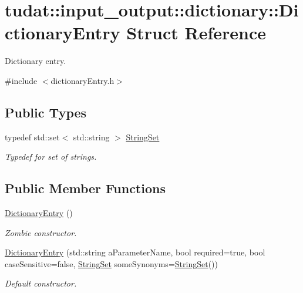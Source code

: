 \hypertarget{structtudat_1_1input__output_1_1dictionary_1_1DictionaryEntry}{}\section{tudat\+:\+:input\+\_\+output\+:\+:dictionary\+:\+:Dictionary\+Entry Struct Reference}
\label{structtudat_1_1input__output_1_1dictionary_1_1DictionaryEntry}


Dictionary entry.  




{\ttfamily \#include $<$dictionary\+Entry.\+h$>$}

\subsection*{Public Types}
\begin{DoxyCompactItemize}
\item 
typedef std\+::set$<$ std\+::string $>$ \hyperlink{structtudat_1_1input__output_1_1dictionary_1_1DictionaryEntry_abfd99206f775c73ff0e772894839f97f}{String\+Set}\hypertarget{structtudat_1_1input__output_1_1dictionary_1_1DictionaryEntry_abfd99206f775c73ff0e772894839f97f}{}\label{structtudat_1_1input__output_1_1dictionary_1_1DictionaryEntry_abfd99206f775c73ff0e772894839f97f}

\begin{DoxyCompactList}\small\item\em Typedef for set of strings. \end{DoxyCompactList}\end{DoxyCompactItemize}
\subsection*{Public Member Functions}
\begin{DoxyCompactItemize}
\item 
\hyperlink{structtudat_1_1input__output_1_1dictionary_1_1DictionaryEntry_a1bf55c4fc6fa76d1f3445266b538e712}{Dictionary\+Entry} ()
\begin{DoxyCompactList}\small\item\em Zombie constructor. \end{DoxyCompactList}\item 
\hyperlink{structtudat_1_1input__output_1_1dictionary_1_1DictionaryEntry_a37ace77cdced5c0e492185292eb58fa6}{Dictionary\+Entry} (std\+::string a\+Parameter\+Name, bool required=true, bool case\+Sensitive=false, \hyperlink{structtudat_1_1input__output_1_1dictionary_1_1DictionaryEntry_abfd99206f775c73ff0e772894839f97f}{String\+Set} some\+Synonyms=\hyperlink{structtudat_1_1input__output_1_1dictionary_1_1DictionaryEntry_abfd99206f775c73ff0e772894839f97f}{String\+Set}())
\begin{DoxyCompactList}\small\item\em Default constructor. \end{DoxyCompactList}\end{DoxyCompactItemize}
